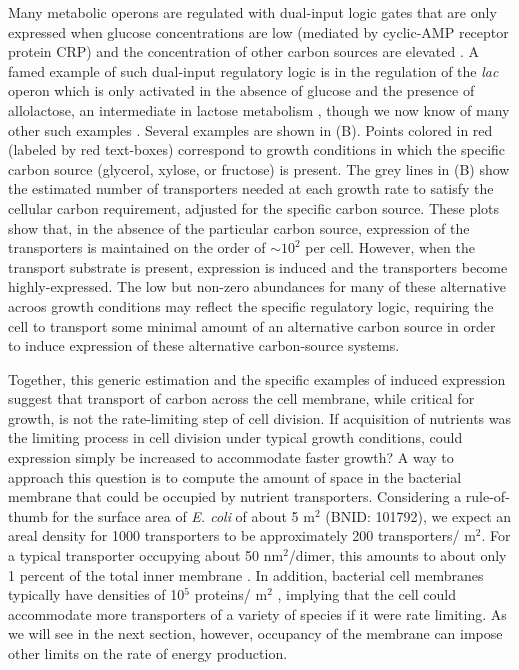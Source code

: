 Many metabolic operons are regulated with dual-input logic gates that are only
expressed when glucose concentrations are low (mediated by cyclic-AMP receptor
protein CRP) and the concentration of other carbon sources are elevated
\citep{gama-castro2016, zhang2014a}. A famed example of such dual-input
regulatory logic is in the regulation of the \textit{lac} operon which is only
activated in the absence of glucose and the presence of allolactose, an
intermediate in lactose metabolism \citep{jacob1961}, though we now know of many
other such examples \citep{ireland2020, gama-castro2016, belliveau2018}.
Several examples are shown in (B). Points colored in red
(labeled by red text-boxes) correspond to growth conditions in which the
specific carbon source (glycerol, xylose, or fructose) is present. The grey
lines in (B) show the estimated number of transporters needed
at each growth rate to satisfy the cellular carbon requirement, adjusted for the
specific carbon source. These plots show that, in the absence of the particular
carbon source, expression of the transporters is maintained on the order of
$\sim 10^2$ per cell. However, when the transport substrate is present,
expression is induced and the transporters become highly-expressed. The low but
non-zero abundances for many  of these alternative acroos growth conditions may
reflect the specific regulatory logic, requiring the cell to transport some
minimal  amount of an alternative carbon source in order to induce expression
of these alternative carbon-source systems.

Together, this generic estimation and the specific examples of induced
expression suggest that transport of carbon across the cell membrane, while
critical for growth, is not the rate-limiting step of cell division. If
acquisition of nutrients was the limiting process in cell division under
typical growth conditions, could expression simply be increased to
accommodate faster growth? A way to approach this question is to compute the
amount of space in the bacterial membrane that could be occupied by nutrient
transporters. Considering a rule-of-thumb for the surface area of \textit{E.
coli} of about 5 \textmu m$^2$ (BNID: 101792), we expect an areal density for
1000 transporters to be approximately 200 transporters/ \textmu m$^2$. For a
typical transporter occupying about 50 nm$^2$/dimer, this amounts to about
only 1 percent of the total inner membrane \citep{szenk2017}. In addition,
bacterial cell membranes typically have densities of 10$^5$ proteins/\textmu
m$^2$ \citep{phillips2018}, implying that the cell could accommodate more
transporters of a variety of species if it were rate limiting. As we will see
in the next section, however, occupancy of the membrane can impose other
limits on the rate of energy production.
